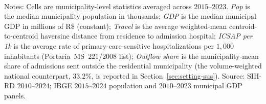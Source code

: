 \begin{table}[h!]
\centering
\caption{Summary statistics by Brazilian macro-region, $2015$--$2023$ pooled.}
\label{tab:summary-stats}
\small
{}%
\\[0.5em]
\begin{minipage}{0.97\textwidth}
\footnotesize Notes: Cells are municipality-level statistics averaged
across $2015$--$2023$. \emph{Pop} is the median municipality
population in thousands; \emph{GDP} is the median municipal GDP in
millions of R\$ (constant); \emph{Travel} is the average weighted-mean
centroid-to-centroid haversine distance from residence to admission
hospital; \emph{ICSAP per 1k} is the average rate of
primary-care-sensitive hospitalizations per $1{,}000$ inhabitants
(Portaria~MS~$221$/$2008$ list); \emph{Outflow share} is the
municipality-mean share of admissions sent outside the residential
municipality (the volume-weighted national counterpart, $33.2\%$, is
reported in Section~\ref{sec:setting-sus}). Source: SIH-RD
$2010$--$2024$; IBGE $2015$--$2024$ population and $2010$--$2023$
municipal GDP panels.
\end{minipage}
\end{table}
